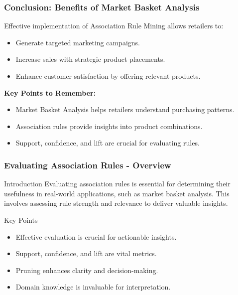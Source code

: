 \documentclass[aspectratio=169]{beamer}
\begin{document}
\begin{frame}[fragile]
    \frametitle{Conclusion: Benefits of Market Basket Analysis}
    Effective implementation of Association Rule Mining allows retailers to:
    
    \begin{itemize}
        \item Generate targeted marketing campaigns.
        \item Increase sales with strategic product placements.
        \item Enhance customer satisfaction by offering relevant products.
    \end{itemize}
    
    \textbf{Key Points to Remember:}
    \begin{itemize}
        \item Market Basket Analysis helps retailers understand purchasing patterns.
        \item Association rules provide insights into product combinations.
        \item Support, confidence, and lift are crucial for evaluating rules.
    \end{itemize}
\end{frame}

\begin{frame}[fragile]
    \frametitle{Evaluating Association Rules - Overview}
    \begin{block}{Introduction}
        Evaluating association rules is essential for determining their usefulness in real-world applications, such as market basket analysis. This involves assessing rule strength and relevance to deliver valuable insights.
    \end{block}
    
    \begin{block}{Key Points}
        \begin{itemize}
            \item Effective evaluation is crucial for actionable insights.
            \item Support, confidence, and lift are vital metrics.
            \item Pruning enhances clarity and decision-making.
            \item Domain knowledge is invaluable for interpretation.
        \end{itemize}
    \end{block}
\end{frame}
\end{document}
